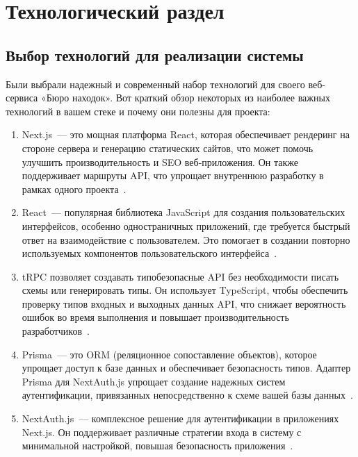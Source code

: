 \section{Технологический раздел}
\label{sec:technology}

\subsection{Выбор технологий для реализации системы}

Были выбрали надежный и современный набор технологий для своего веб-сервиса «Бюро находок». Вот краткий обзор некоторых из наиболее важных технологий в вашем стеке и почему они полезны для проекта:

\begin{enumerate}
	\item Next.js~--- это мощная платформа React, которая обеспечивает рендеринг на стороне сервера и генерацию статических сайтов, что может помочь улучшить производительность и SEO веб-приложения. Он также поддерживает маршруты API, что упрощает внутреннюю разработку в рамках одного проекта~\cite{bib:nextjs}.
	
	\item React~--- популярная библиотека JavaScript для создания пользовательских интерфейсов, особенно одностраничных приложений, где требуется быстрый ответ на взаимодействие с пользователем. Это помогает в создании повторно используемых компонентов пользовательского интерфейса~\cite{bib:reactjs}.
	
	\item tRPC позволяет создавать типобезопасные API без необходимости писать схемы или генерировать типы. Он использует TypeScript, чтобы обеспечить проверку типов входных и выходных данных API, что снижает вероятность ошибок во время выполнения и повышает производительность разработчиков~\cite{bib:trpc}.
	
	\item Prisma~--- это ORM (реляционное сопоставление объектов), которое упрощает доступ к базе данных и обеспечивает безопасность типов. Адаптер Prisma для NextAuth.js упрощает создание надежных систем аутентификации, привязанных непосредственно к схеме вашей базы данных~\cite{bib:prisma}.
	
	\item NextAuth.js~--- комплексное решение для аутентификации в приложениях Next.js. Он поддерживает различные стратегии входа в систему с минимальной настройкой, повышая безопасность приложения~\cite{bib:nextauth}.
	

\end{enumerate}
